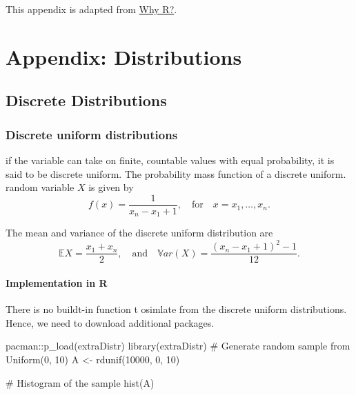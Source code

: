 \documentclass[
  letterpaper,
  DIV=11,
  numbers=noendperiod]{scrreprt}
\newenvironment{Shaded}{\begin{snugshade}}{\end{snugshade}}
\newcommand{\CommentTok}[1]{\textcolor[rgb]{0.37,0.37,0.37}{#1}}
\newcommand{\DecValTok}[1]{\textcolor[rgb]{0.68,0.00,0.00}{#1}}
\newcommand{\FunctionTok}[1]{\textcolor[rgb]{0.28,0.35,0.67}{#1}}
\newcommand{\NormalTok}[1]{\textcolor[rgb]{0.00,0.23,0.31}{#1}}
\newcommand{\OtherTok}[1]{\textcolor[rgb]{0.00,0.23,0.31}{#1}}
\newcommand{\SpecialCharTok}[1]{\textcolor[rgb]{0.37,0.37,0.37}{#1}}
\begin{document}
This appendix is adapted from
\href{https://tqtbui.github.io/introbook/app-rintro.html}{Why R?}.

\chapter{Appendix: Distributions}\label{appendix-distributions}

\newcommand{\E}{\mathbb{E}}
\newcommand{\var}{\mathbb{V}ar}

\section{Discrete Distributions}\label{discrete-distributions}

\subsection{Discrete uniform
distributions}\label{discrete-uniform-distributions}

if the variable can take on finite, countable values with equal
probability, it is said to be discrete uniform. The probability mass
function of a discrete uniform. random variable \(X\) is given by \[
f(x) = \frac{1}{x_n-x_1+1},\quad \text{for}\quad x=x_1,\dots,x_n.
\]

The mean and variance of the discrete uniform distribution are \[
\mathbb{E}X = \frac{x_1+x_n}{2},\quad \text{and}\quad \mathbb{V}ar(X) = \frac{(x_n-x_1+1)^2 -1}{12}.\]

\subsubsection{Implementation in R}\label{implementation-in-r}

There is no buildt-in function t osimlate from the discrete uniform
distributions. Hence, we need to download additional packages.

\begin{Shaded}
\begin{Highlighting}[]
\NormalTok{pacman}\SpecialCharTok{::}\FunctionTok{p\_load}\NormalTok{(extraDistr)}
\FunctionTok{library}\NormalTok{(extraDistr)}
\CommentTok{\# Generate random sample from Uniform(0, 10)}
\NormalTok{A }\OtherTok{\textless{}{-}} \FunctionTok{rdunif}\NormalTok{(}\DecValTok{10000}\NormalTok{, }\DecValTok{0}\NormalTok{, }\DecValTok{10}\NormalTok{) }

\CommentTok{\# Histogram of the sample}
\FunctionTok{hist}\NormalTok{(A)}
\end{Highlighting}
\end{Shaded}
\end{document}
